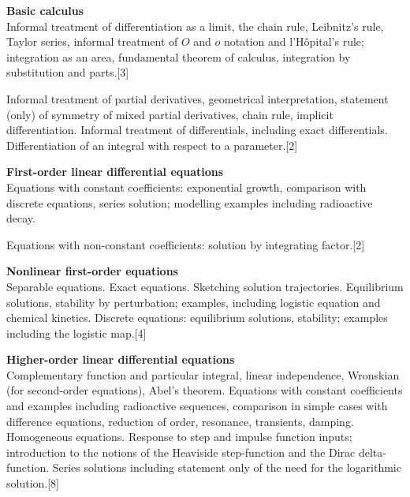 \documentclass[a4paper]{article}
\begin{document}
\maketitle
{\small
  \noindent\textbf{Basic calculus}\\
  Informal treatment of differentiation as a limit, the chain rule, Leibnitz's rule, Taylor series, informal treatment of $O$ and $o$ notation and l'H\^opital’s rule; integration as an area, fundamental theorem of calculus, integration by substitution and parts.\hspace*{\fill}[3]

  \vspace{5pt}
  \noindent Informal treatment of partial derivatives, geometrical interpretation, statement (only) of symmetry of mixed partial derivatives, chain rule, implicit differentiation. Informal treatment of differentials, including exact differentials. Differentiation of an integral with respect to a parameter.\hspace*{\fill}[2]

  \vspace{10pt}
  \noindent\textbf{First-order linear differential equations}\\
  Equations with constant coefficients: exponential growth, comparison with discrete equations, series solution; modelling examples including radioactive decay.

  \vspace{5pt}
  \noindent Equations with non-constant coefficients: solution by integrating factor.\hspace*{\fill}[2]

  \vspace{10pt}
  \noindent\textbf{Nonlinear first-order equations}\\
  Separable equations. Exact equations. Sketching solution trajectories. Equilibrium solutions, stability by perturbation; examples, including logistic equation and chemical kinetics. Discrete equations: equilibrium solutions, stability; examples including the logistic map.\hspace*{\fill}[4]

  \vspace{10pt}
  \noindent\textbf{Higher-order linear differential equations}\\
  Complementary function and particular integral, linear independence, Wronskian (for second-order equations), Abel's theorem. Equations with constant coefficients and examples including radioactive sequences, comparison in simple cases with difference equations, reduction of order, resonance, transients, damping. Homogeneous equations. Response to step and impulse function inputs; introduction to the notions of the Heaviside step-function and the Dirac delta-function. Series solutions including statement only of the need for the logarithmic solution.\hspace*{\fill}[8]

}
\end{document}
